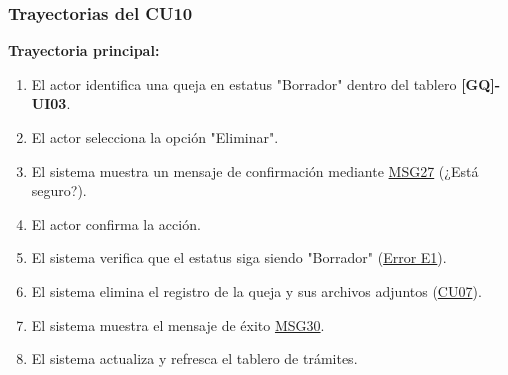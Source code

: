 \begin{appendices}
\subsubsection{Trayectorias del CU10}
\textbf{Trayectoria principal:}
\begin{enumerate}[nosep]
    \item El actor identifica una queja en estatus "Borrador" dentro del tablero \textbf{[GQ]-UI03}.
    \item El actor selecciona la opción "Eliminar".
    \item El sistema muestra un mensaje de confirmación mediante \hyperlink{msg:MSG27}{MSG27} (¿Está seguro?).
    \item El actor confirma la acción.
    \item El sistema verifica que el estatus siga siendo "Borrador" (\hyperlink{err:E15}{Error E1}).
    \item El sistema elimina el registro de la queja y sus archivos adjuntos (\hyperlink{anexo:casos_uso}{CU07}).
    \item El sistema muestra el mensaje de éxito \hyperlink{msg:MSG30}{MSG30}.
    \item El sistema actualiza y refresca el tablero de trámites.
\end{enumerate}


\end{appendices}

